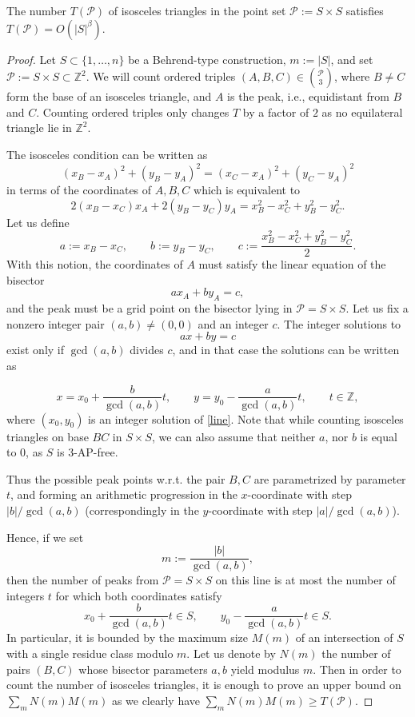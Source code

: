 \documentclass[10pt,a4paper]{amsart}
\newcommand\cP{{\mathcal P}}
\begin{document}
	\begin{lemma}\label{isocount}
	The number $T(\cP)$ of isosceles triangles in the point set $\cP:=S\times S$ satisfies $T(\cP)=O(|S|^{\beta}).$
	\end{lemma}

	\begin{proof}
	Let $S\subset\{1,\dots,n\}$ be a Behrend-type construction, $m:=|S|$, and set $\cP:=S\times S\subset\mathbb Z^2$.  We will count ordered triples $(A,B,C)\in \binom {\cP}{3}$, where $B\ne C$ form the base of an isosceles triangle, and $A$ is the peak, i.e.,  equidistant from $B$ and $C$. Counting ordered triples only changes $T$ by a factor of $2$ as no equilateral triangle lie in $\mathbb Z^2$.
	
	The isosceles condition can be  written as
	\[
	(x_B-x_A)^2+(y_B-y_A)^2=(x_C-x_A)^2+(y_C-y_A)^2
	\]
	in terms of the coordinates of $A,B,C$ which is equivalent to 
	\[
	2(x_B-x_C)x_A + 2(y_B-y_C)y_A = x_B^2-x_C^2 + y_B^2-y_C^2.
	\]
	Let us define
	\[
	a:=x_B-x_C,\qquad b:=y_B-y_C,\qquad c:=\frac{x_B^2-x_C^2+y_B^2-y_C^2}{2}.
	\]
	With this notion, the coordinates of $A$ must satisfy the linear equation of the bisector
	\begin{equation}\label{line}
	a x_A + b y_A = c,
	\end{equation}
	and the peak must be a grid  point on the bisector lying in $\cP=S\times S$.
	Let us 	fix a nonzero integer pair $(a,b)\neq(0,0)$ and an integer $c$. The integer solutions to
	\[
	a x + b y = c
	\]
	exist only if $\gcd(a,b)$ divides $c$, and in that case the solutions can be written as 
	
	\[
	x = x_0 + \frac{b}{\gcd(a,b)}t,\qquad y = y_0 - \frac{a}{\gcd(a,b)} t,\qquad t\in\mathbb Z,
	\] where  $(x_0,y_0)$ is an integer solution of \eqref{line}. Note that while counting isosceles triangles on base $BC$ in $S\times S$, we can also assume that neither $a$, nor $b$ is equal to $0$, as $S$ is $3$-AP-free.
	
	
	Thus the possible peak points w.r.t. the pair $B, C$ are parametrized by  parameter $t$, and forming an arithmetic progression in the $x$-coordinate with step $|b|/\gcd(a,b)$ (correspondingly in the $y$-coordinate with step $|a|/\gcd(a,b)$).
	
	Hence, if we set
	\[
	m:=\frac{|b|}{\gcd(a,b)},
	\]
	then the number of peaks from $\cP=S\times S$ on this line is at most the number of integers $t$ for which both coordinates satisfy
	\[
	x_0 + \frac{b}{\gcd(a,b)}t\in S,\qquad y_0 - \frac{a}{\gcd(a,b)}t\in S.
	\]
	In particular, it is bounded by the maximum size $M(m)$ of an intersection of $S$ with a single residue class modulo $m$. Let us denote by $N(m)$ the number of pairs $(B,C)$ whose bisector parameters $a,b$ yield modulus $m$. Then in order to count the number of isosceles triangles, it is enough to prove an upper bound on $\sum_m N(m)M(m)$ as we clearly have $\sum_m N(m)M(m)\ge T(\cP)$.
	

\end{proof}
\end{document}
